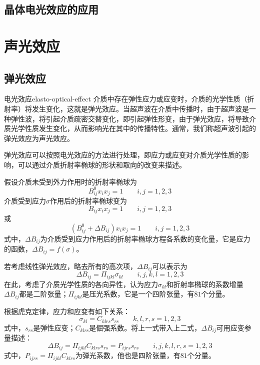 \documentclass[cn,10pt,chinesefont=founder,math=mtpro2,cite=super,toc=onecol,twoside,openany]{elegantbook}
\begin{document}
\subsection{晶体电光效应的应用}

\section{声光效应}

\subsection{弹光效应}

\begin{definition}{电光效应}{elasto-optical-effect}
	介质中存在弹性应力或应变时，介质的光学性质（折射率）将发生变化，这就是弹光效应。当超声波在介质中传播时，由于超声波是一种弹性波，将引起介质疏密交替变化，即引起弹性形变，由于弹光效应，将导致介质光学性质发生变化，从而影响光在其中的传播特性。通常，我们称超声波引起的弹光效应为声光效应。
\end{definition}

弹光效应可以按照电光效应的方法进行处理，即应力或应变对介质光学性质的影响，可以通过介质折射率椭球的形状和取向的改变来描述。

假设介质未受到外力作用时的折射率椭球为
\begin{equation}
B^0_{ij}x_ix_j=1\qquad i,j=1,2,3
\end{equation}
介质受到应力$\sigma$作用后的折射率椭球变为
\begin{equation}
B_{ij}x_ix_j=1\qquad i,j=1,2,3
\end{equation}
或
\begin{equation}
(B^0_{ij}+\Delta B_{ij})x_ix_j=1\qquad i,j=1,2,3
\end{equation}
式中，$\Delta B_{ij}$为介质受到应力作用后的折射率椭球方程各系数的变化量，它是应力的函数，$\Delta B_{ij}=f(\sigma)$。

若考虑线性弹光效应，略去所有的高次项，$\Delta B_{ij}$可以表示为
\begin{equation}
\Delta B_{ij}=\varPi_{ijkl}\sigma_{kl}\qquad i,j,k,l=1,2,3
\end{equation}
在此，考虑了介质光学性质的各向异性，认为应力$\sigma_{kl}$和折射率椭球的系数增量$\Delta B_{ij}$都是二阶张量；$\varPi_{ijkl}$是压光系数，它是一个四阶张量，有$81$个分量。

根据虎克定律，应力和应变有如下关系：
\begin{equation}
\sigma_{kl}=C_{klrs}s_{rs}\qquad k,l,r,s=1,2,3
\end{equation}
式中，$s_{rs}$是弹性应变；$C_{klrs}$是倔强系数。将上一式带入上二式，$\Delta B_{ij}$可用应变参量描述：
\begin{equation}
\Delta B_{ij}=\varPi_{ijkl}C_{klrs}s_{rs}=P_{ijrs}s_{rs}\qquad i,j,k,l,r,s=1,2,3
\end{equation}
式中，$P_{ijrs}=\varPi_{ijkl}C_{klrs}$为弹光系数，他也是四阶张量，有$81$个分量。
\end{document}
